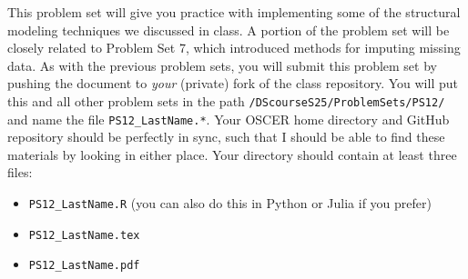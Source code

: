 \documentclass[12pt,english]{exam}
\begin{document}
This problem set will give you practice with implementing some of the structural modeling techniques we discussed in class. A portion of the problem set will be closely related to Problem Set 7, which introduced methods for imputing missing data.
As with the previous problem sets, you will submit this problem set by pushing the document to \emph{your} (private) fork of the class repository. You will put this and all other problem sets in the path \texttt{/DScourseS25/ProblemSets/PS12/} and name the file \texttt{PS12\_LastName.*}. Your OSCER home directory and GitHub repository should be perfectly in sync, such that I should be able to find these materials by looking in either place. Your directory should contain at least three files:
\begin{itemize}
    \item \texttt{PS12\_LastName.R} (you can also do this in Python or Julia if you prefer)
    \item \texttt{PS12\_LastName.tex}
    \item \texttt{PS12\_LastName.pdf}
\end{itemize}
\end{document}
